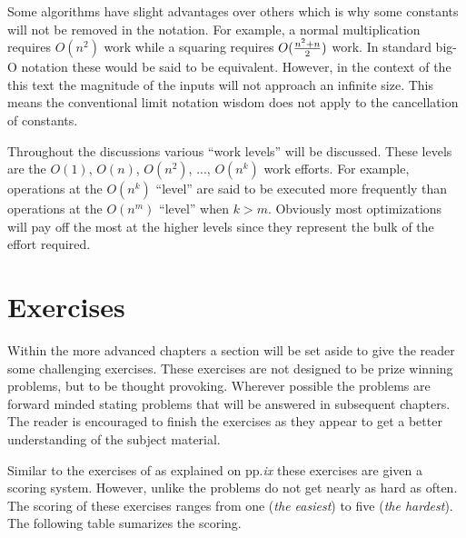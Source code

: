 \documentclass[b5paper]{book}
\begin{document}
Some algorithms have slight advantages over others which is why some constants will not be removed in 
the notation.  For example, a normal multiplication requires $O(n^2)$ work while a squaring requires 
$O({{n^2 + n}\over 2})$ work.  In standard big-O notation these would be said to be equivalent.  However, in the 
context of the this text the magnitude of the inputs will not approach an infinite size.  This means the conventional limit 
notation wisdom does not apply to the cancellation of constants.

Throughout the discussions various ``work levels'' will be discussed.  These levels are the $O(1)$,
$O(n)$, $O(n^2)$, ..., $O(n^k)$ work efforts.  For example, operations at the $O(n^k)$ ``level'' are said to be
executed more frequently than operations at the $O(n^m)$ ``level'' when $k > m$.  Obviously most optimizations will pay
off the most at the higher levels since they represent the bulk of the effort required.  

\section{Exercises}
Within the more advanced chapters a section will be set aside to give the reader some challenging exercises.  These exercises are not 
designed to be prize winning problems, but to be thought provoking.  Wherever possible the problems are forward minded stating 
problems that will be answered in subsequent chapters.  The reader is encouraged to finish the exercises as they appear to get a 
better understanding of the subject material.  

Similar to the exercises of \cite{TAOCPV2} as explained on pp.\textit{ix} these exercises are given a scoring system.  However, unlike 
\cite{TAOCPV2} the problems do not get nearly as hard as often.  The scoring of these exercises ranges from one (\textit{the easiest}) to
five (\textit{the hardest}).  The following table sumarizes the scoring.
\end{document}
